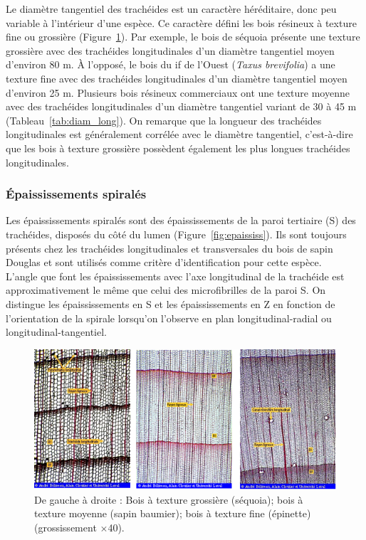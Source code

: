 Le diamètre tangentiel des trachéides est un caractère héréditaire, donc peu variable à l'intérieur d'une espèce. Ce caractère défini les bois résineux à texture fine ou grossière (Figure~\ref{fig:texture}). Par exemple, le bois de séquoia présente une texture grossière avec des trachéides longitudinales d'un diamètre tangentiel moyen d'environ 80 \micro m. À l'opposé, le bois du if de l'Ouest (\textit{Taxus brevifolia}) a une texture fine avec des trachéides longitudinales d'un diamètre tangentiel moyen d'environ 25 \micro m. Plusieurs bois résineux commerciaux ont une texture moyenne avec des trachéides longitudinales d'un diamètre tangentiel variant de 30 à 45 \micro m (Tableau~\ref{tab:diam_long}). On remarque que la longueur des trachéides longitudinales est généralement corrélée avec le diamètre tangentiel, c'est-à-dire que les bois à texture grossière possèdent également les plus longues trachéides longitudinales.

\subsubsection{Épaississements spiralés}

Les épaississements spiralés sont des épaississements de la paroi tertiaire (S) des trachéides, disposés du côté du lumen (Figure~\ref{fig:epaississ}). Ils sont toujours présents chez les trachéides longitudinales et transversales du bois de sapin Douglas et sont utilisés comme critère d'identification pour cette espèce.\\

L'angle que font les épaississements avec l'axe longitudinal de la trachéide est approximativement le même que celui des microfibrilles de la paroi S. On distingue les épaississements en \og S \fg  et les épaississements en \og Z \fg  en fonction de l'orientation de la spirale lorsqu'on l'observe en plan longitudinal-radial ou longitudinal-tangentiel. 

\begin{figure}[h]
\centering
\includegraphics[scale=0.7]{img/texture}
\caption{De gauche à droite : Bois à texture grossière (séquoia); bois à texture moyenne (sapin baumier); bois à texture fine (épinette) (grossissement $\times$40).}
\label{fig:texture}
\end{figure}

